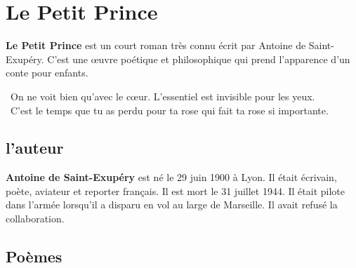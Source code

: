 \documentclass[12pt]{article}
\begin{document}

\newtheorem{Definition}{Définition}
\newtheorem{Theorem}{Théorème}
\newtheorem{Proposition}{Propriété}

\renewcommand{\labelitemi}{$\bullet$}
\renewcommand{\labelitemii}{$\circ$}

\setlength{\columnseprule}{1pt}

\section*{Le Petit Prince}

\textbf{Le Petit Prince} est un court roman très connu écrit par Antoine de Saint-Exupéry. 
C'est une œuvre poétique et philosophique qui prend l'apparence d'un conte pour enfants. 

\begin{center}
  {\selectfont \og On ne voit bien qu'avec le cœur. L'essentiel est invisible pour les yeux. \fg }\\
  {\selectfont \og C'est le temps que tu as perdu pour ta rose qui fait ta rose si importante. \fg}\\

\end{center}

\subsection*{l’auteur }
\textbf{Antoine de Saint-Exupéry} est né le 29 juin 1900 à Lyon. Il était  écrivain, poète, aviateur et reporter français. Il est mort le 31 juillet 1944. Il était pilote dans l’armée lorsqu’il a disparu en vol au large de Marseille. Il avait refusé la collaboration.

\subsection*{Poèmes}
\end{document}
